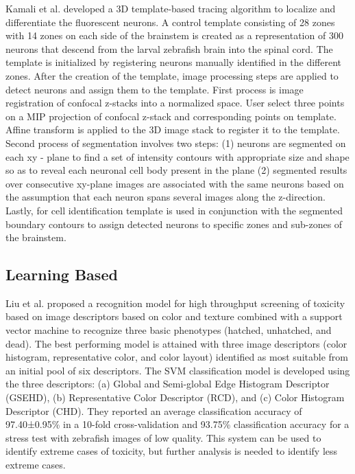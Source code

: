 Kamali et al. \cite{kamali2009} developed a 3D template-based tracing algorithm to localize and differentiate the fluorescent neurons. A control template consisting of 28 zones with 14 zones on each side of the brainstem is created as a representation of 300 neurons that descend from the larval zebrafish brain into the spinal cord. The template is initialized by registering neurons manually identified in the different zones. After the creation of the template, image processing steps are applied to detect neurons and assign them to the template. First process is image registration of confocal z-stacks into a normalized space. User select three points on a MIP projection of confocal z-stack and corresponding points on template. Affine transform is applied to the 3D image stack to register it to the template. Second process of segmentation involves two steps: (1) neurons are segmented on each xy - plane to find a set of intensity contours with appropriate size and shape so as to reveal each neuronal cell body present in the plane (2) segmented results over consecutive xy-plane images are associated with the same neurons based on the assumption that each neuron spans several images along the z-direction. Lastly, for cell identification template is used in conjunction with the segmented boundary contours to assign detected neurons to specific zones and sub-zones of the brainstem.

\subsection{Learning Based}

Liu et al. \cite{Liu12} proposed a recognition model for high throughput screening of toxicity based on image descriptors based on color and texture combined with a support vector machine to recognize three basic phenotypes (hatched, unhatched, and dead). The best performing model is attained with three image descriptors (color histogram, representative color, and color layout) identified as most suitable from an initial pool of six descriptors. The SVM classification model is developed using the three descriptors: (a) Global and Semi-global Edge Histogram Descriptor (GSEHD), (b) Representative Color Descriptor (RCD), and (c) Color Histogram Descriptor (CHD). They reported an average classification accuracy of 97.40±0.95\% in a 10-fold cross-validation and 93.75\% classification accuracy for a stress test with zebrafish images of low quality. This system can be used to identify extreme cases of toxicity, but further analysis is needed to identify less extreme cases.

